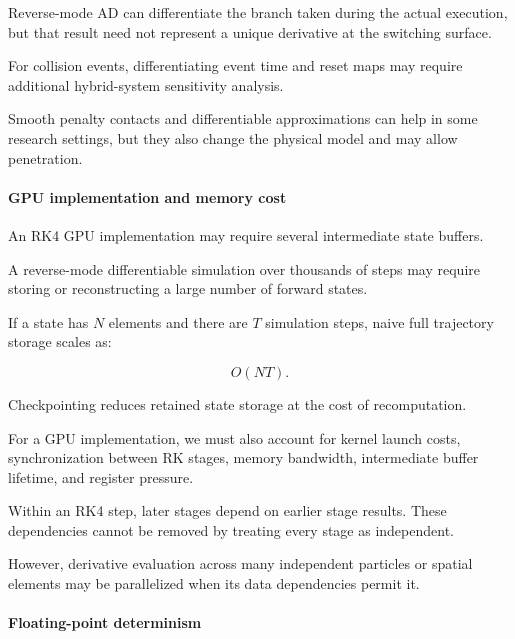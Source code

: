 Reverse-mode AD can differentiate the branch taken during the actual execution, but that result need not represent a unique derivative at the switching surface.

For collision events, differentiating event time and reset maps may require additional hybrid-system sensitivity analysis.

Smooth penalty contacts and differentiable approximations can help in some research settings, but they also change the physical model and may allow penetration.

\paragraph{GPU implementation and memory cost}\label{02-foundations-ii-ch022-gpu-implementation-and-memory-cost}

\hypertarget{02-foundations-ii-ch022-gpu-implementation-and-memory-cost}{}

An RK4 GPU implementation may require several intermediate state buffers.

A reverse-mode differentiable simulation over thousands of steps may require storing or reconstructing a large number of forward states.

If a state has \(N\) elements and there are \(T\) simulation steps, naive full trajectory storage scales as:

\[
O(NT).
\]

Checkpointing reduces retained state storage at the cost of recomputation.

For a GPU implementation, we must also account for kernel launch costs, synchronization between RK stages, memory bandwidth, intermediate buffer lifetime, and register pressure.

Within an RK4 step, later stages depend on earlier stage results. These dependencies cannot be removed by treating every stage as independent.

However, derivative evaluation across many independent particles or spatial elements may be parallelized when its data dependencies permit it.

\paragraph{Floating-point determinism}\label{02-foundations-ii-ch022-floating-point-determinism}

\hypertarget{02-foundations-ii-ch022-floating-point-determinism}{}

